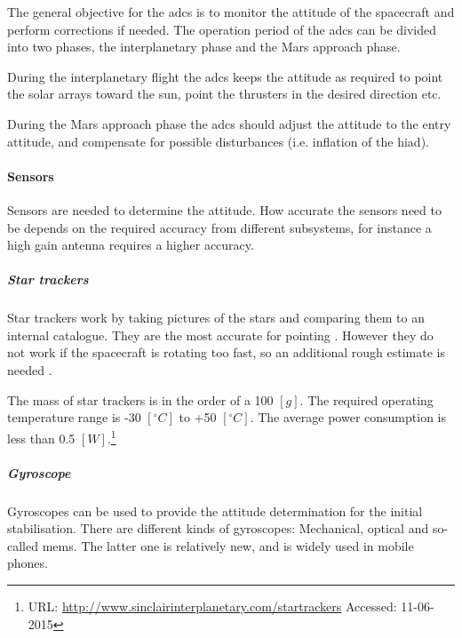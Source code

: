 The general objective for the \gls{adcs} is to monitor the attitude of the spacecraft and perform corrections if needed. The operation period of the \gls{adcs} can be divided into two phases, the interplanetary phase and the Mars approach phase.

During the interplanetary flight the \gls{adcs} keeps the attitude as required to point the solar arrays toward the sun, point the thrusters in the desired direction etc.

During the Mars approach phase the \gls{adcs} should adjust the attitude to the entry attitude, and compensate for possible disturbances (i.e. inflation of the \gls{hiad}).



\paragraph{Sensors} Sensors are needed to determine the attitude. How accurate the sensors need to be depends on the required accuracy from different subsystems, for instance a high gain antenna requires a higher accuracy. 

\subparagraph{Star trackers}
Star trackers work by taking pictures of the stars and comparing them to an internal catalogue. They are the most accurate for pointing \cite{CarlChristianLiebe1995}. However they do not work if the spacecraft is rotating too fast, so an additional rough estimate is needed \cite[p. 584]{Wertz2011}. 

The mass of star trackers is in the order of a 100 $\left[g\right]$. The required operating temperature range is -30 $\left[^\circ C\right]$ to +50 $\left[^\circ C\right]$. The average power consumption is less than 0.5 $\left[W\right]$.\footnote{URL: \url{http://www.sinclairinterplanetary.com/startrackers} Accessed: 11-06-2015}

\subparagraph{Gyroscope}                        
Gyroscopes can be used to provide the attitude determination for the initial stabilisation. There are different kinds of gyroscopes: Mechanical, optical and so-called \gls{mems}. The latter one is relatively new, and is widely used in mobile phones. 

